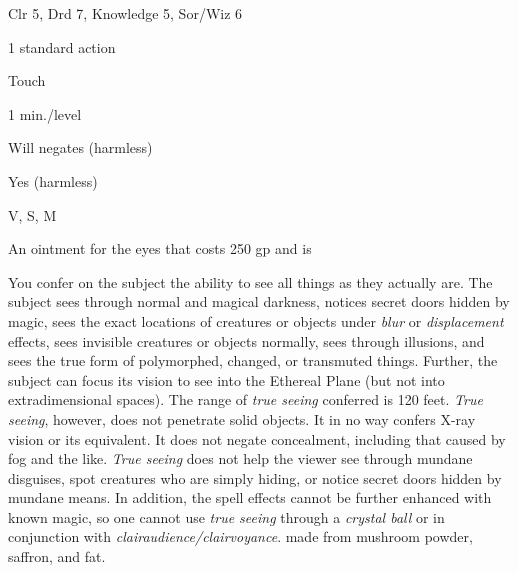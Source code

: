 
\begin{description*}
\item[Level:] Clr 5, Drd 7, Knowledge 5, Sor/Wiz 6
\item[Casting Time:] 1 standard action
\item[Range:] Touch
\item[Duration:] 1 min./level
\item[Saving Throw:] Will negates (harmless)
\item[Spell Resistance:] Yes (harmless)
\item[Components:] V, S, M
\item[Arcane Material Component:] An ointment for the eyes that costs 250 gp and is
\end{description*}

You confer on the subject the ability to see all things as they actually are. The
subject sees through normal and magical darkness, notices secret doors hidden by
magic, sees the exact locations of creatures or objects under \textit{blur} or
\textit{displacement} effects, sees invisible creatures or objects normally, sees
through illusions, and sees the true form of polymorphed, changed, or transmuted
things. Further, the subject can focus its vision to see into the Ethereal Plane
(but not into extradimensional spaces). The range of \textit{true seeing} conferred
is 120 feet.
\textit{True seeing}, however, does not penetrate solid objects. It in no way confers
X-ray vision or its equivalent. It does not negate concealment, including that
caused by fog and the like. \textit{True seeing} does not help the viewer see through
mundane disguises, spot creatures who are simply hiding, or notice secret doors
hidden by mundane means. In addition, the spell effects cannot be further enhanced
with known magic, so one cannot use \textit{true seeing} through a \textit{crystal
ball} or in conjunction with \textit{clairaudience/clairvoyance}.
made from mushroom powder, saffron, and fat.